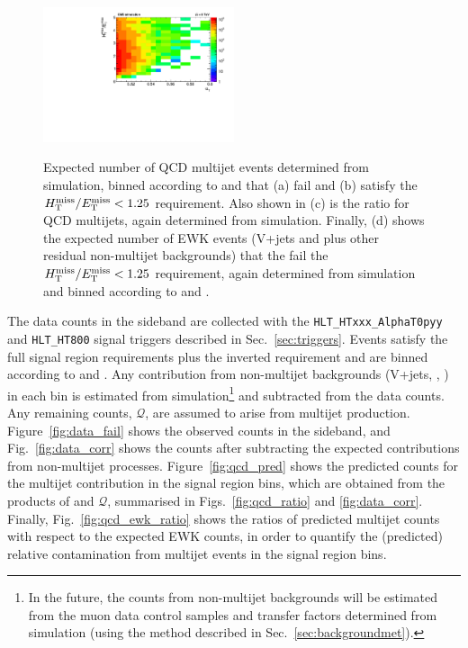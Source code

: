 \begin{figure}[!h]
{    \includegraphics[width=0.5\textwidth]{figures/qcd/th2d_had_qcd_le3j_eq0b_200}
  } \\
  \caption{Expected number of QCD multijet events determined from
    simulation, binned according to \njet and \scalht that (a) fail
    and (b) satisfy the $\mbox{$\mbox{$H_{\rm T}^{\rm miss}$} / \mbox{$E_\text{T}^{\rm miss}$}$} < 1.25$ requirement. Also shown in
    (c) is the ratio \rmhtmet for QCD multijets, again determined from
    simulation. Finally, (d) shows the expected number of EWK events
    (V+jets and \ttbar plus other residual non-multijet backgrounds)
    that the fail the $\mbox{$\mbox{$H_{\rm T}^{\rm miss}$} / \mbox{$E_\text{T}^{\rm miss}$}$} < 1.25$ requirement, again determined
    from simulation and binned according to \njet and \scalht.}
  \label{fig:qcd_plots}
\end{figure}

The data counts in the \mhtmet sideband are collected with the
\verb!HLT_HTxxx_AlphaT0pyy!  and \verb!HLT_HT800! signal triggers
described in Sec.~\ref{sec:triggers}. Events satisfy the full signal
region requirements plus the inverted \mhtmet requirement and are
binned according to \njet and \scalht. Any contribution from
non-multijet backgrounds (V+jets, \ttbar, \etc) in each bin is
estimated from simulation\footnote{In the future, the counts from
  non-multijet backgrounds will be estimated from the muon data
  control samples and transfer factors determined from simulation
  (using the method described in Sec.~\ref{sec:backgroundmet}).} and
subtracted from the data counts. Any remaining counts, $\mathcal{Q}$,
are assumed to arise from multijet production.
Figure~\ref{fig:data_fail} shows the observed counts in the \mhtmet
sideband, and Fig.~\ref{fig:data_corr} shows the counts after
subtracting the expected contributions from non-multijet processes.
Figure~\ref{fig:qcd_pred} shows the predicted counts for the multijet
contribution in the signal region bins, which are obtained from the
products of \rmhtmet and $\mathcal{Q}$, summarised in
Figs.~\ref{fig:qcd_ratio} and \ref{fig:data_corr}. Finally,
Fig.~\ref{fig:qcd_ewk_ratio} shows the ratios of predicted multijet
counts with respect to the expected EWK counts, in order to quantify
the (predicted) relative contamination from multijet events in the
signal region bins.

